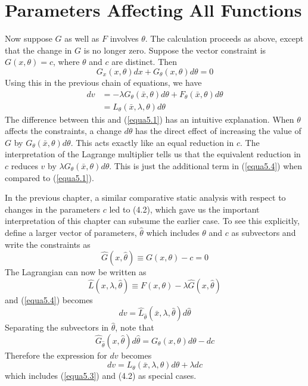 \section*{Parameters Affecting All Functions}

Now suppose $G$ as well as $F$ involves $\theta$. The calculation proceeds as above, except that the change in $G$ is no longer zero. Suppose the vector constraint is $G(x, \theta)=c$, where $\theta$ and $c$ are distinct. Then
\begin{equation*}
G_x(x, \theta) dx + G_\theta(x, \theta) d\theta = 0
\end{equation*}
Using this in the previous chain of equations, we have
\begin{equation}  \label{equa5.4}
\begin{array}{rl}
dv & = - \lambda G_\theta(\bar{x}, \theta) d\theta + F_\theta(\bar{x}, \theta) d\theta \\
   &  = L_\theta(\bar{x}, \lambda, \theta) d\theta
\end{array}
\end{equation}
The difference between this and (\ref{equa5.1}) has an intuitive explanation. When $\theta$ affects the constraints, a change $d\theta$ has the direct effect of increasing the value of $G$ by $G_\theta(\bar{x}, \theta) d\theta$. This acts exactly like an equal reduction in $c$. The interpretation of the Lagrange multiplier tells us that the equivalent reduction in $c$ reduces $v$ by $\lambda G_\theta( \bar{x}, \theta  )   d\theta$. This is just the additional term in (\ref{equa5.4}) when compared to (\ref{equa5.1}).

In the previous chapter, a similar comparative static analysis with respect to changes in the parameters $c$ led to (4.2), which gave us the important interpretation of this chapter can subsume the earlier case. To see this explicitly, define a larger vector of parameters, $\hat{\theta}$ which includes $\theta$ and $c$ as subvectors and write the constraints as
\begin{equation*}
\hat{G}(x, \hat{\theta}) \equiv G(x, \theta) -c =0
\end{equation*}
The Lagrangian can now be written as
\begin{equation*}
\hat{L}(x, \lambda, \hat{\theta}) \equiv F(x, \theta) - \lambda \hat{G}(x, \hat{\theta})
\end{equation*}
and (\ref{equa5.4}) becomes
\begin{equation*}
 dv = \hat{L}_{\hat{\theta}} (\bar{x}, \lambda, \hat{\theta} ) d\hat{\theta}
\end{equation*}
Separating the subvectors in $\hat{\theta}$, note that 
\begin{equation*}
 \hat{G}_{\hat{\theta}} (x, \hat{\theta} ) d\hat{\theta} = G_\theta(x, \theta) d\theta - dc
\end{equation*}
Therefore the expression for $dv$ becomes
\begin{equation*}
 dv = L_\theta(\bar{x}, \lambda, \theta) d\theta + \lambda dc
\end{equation*}
which includes (\ref{equa5.3}) and (4.2) as special cases.

